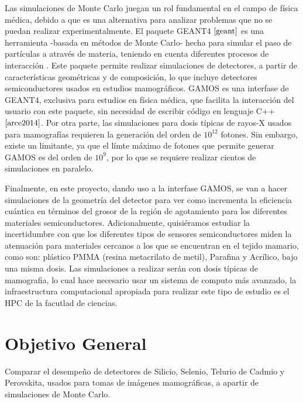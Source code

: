 \documentclass[12pt]{article}
\begin{document}
Las simulaciones de Monte Carlo juegan un rol fundamental en el campo de física médica, debido a que es una alternativa para analizar problemas que no se puedan realizar experimentalmente. El paquete GEANT4 $\cite{geant}$ es una herramienta -basada en métodos de Monte Carlo- hecha para simular el paso de partículas a através de materia,  teniendo en cuenta diferentes procesos de interacción . Este paquete permite realizar simulaciones de detectores, a partir de características geométricas y de composición, lo que incluye detectores semiconductores usados en estudios mamográficos. GAMOS es una interfase de GEANT4, exclusiva para estudios en física médica, que facilita la interacción del usuario con este paquete, sin necesidad de escribir código en lenguaje C++ $\cite{arce2014}$. Por otra parte, las simulaciones para dosis típicas de rayos-X usados para mamografías requieren la generación del orden de $10^{12}$ fotones. Sin embargo, existe un limitante, ya que el límte máximo de fotones que permite generar GAMOS es del orden de $10^9$, por lo que se requiere realizar cientos de simulaciones en paralelo.
\vspace{3mm}

 
Finalmente, en este proyecto, dando uso a la interfase GAMOS, se van a hacer simulaciones de la geometría del detector para ver como incrementa la eficiencia cuántica en términos del grosor de la región de agotamiento para los diferentes materiales semiconductores. Adicionalmente, quisiéramos estudiar la incertidumbre con que los diferentes tipos de sensores semiconductores miden la atenuación para  materiales cercanos a los que se encuentran en el tejido mamario, como son: plástico PMMA (resina metacrilato de metil), Parafina y Acrílico,  bajo una misma dosis. Las simulaciones a realizar serán con dosis típicas de mamografia, lo cual hace necesario usar un sistema de computo más avanzado, la infraestructura computacional apropiada para realizar este tipo de estudio es el HPC de la facutlad de ciencias.   

\section{Objetivo General}


Comparar el desempeño de detectores de Silicio, Selenio, Telurio de Cadmio y Perovskita, usados para tomas de imágenes mamográficas, a apartir de simulaciones de Monte Carlo.    
\end{document}
